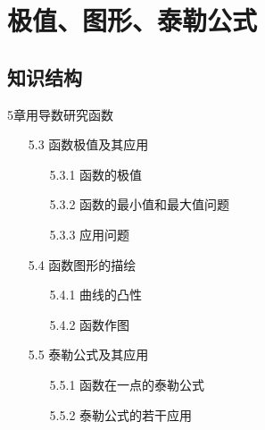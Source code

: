 \documentclass[12pt,UTF8]{ctexart}
\begin{document}
\setcounter{section}{7}
\section{极值、图形、泰勒公式}
\noindent
\subsection{知识结构}
5章用导数研究函数
	\begin{enumerate}
		\item[5.3] 函数极值及其应用
			\begin{enumerate}
				\item[5.3.1] 函数的极值
				\item[5.3.2] 函数的最小值和最大值问题
				\item[5.3.3] 应用问题
			\end{enumerate}
		\item[5.4] 函数图形的描绘
			\begin{enumerate}
				\item[5.4.1] 曲线的凸性
				\item[5.4.2] 函数作图
			\end{enumerate}
		\item[5.5] 泰勒公式及其应用
			\begin{enumerate}
				\item[5.5.1] 函数在一点的泰勒公式
				\item[5.5.2] 泰勒公式的若干应用
			\end{enumerate}
	\end{enumerate}
\end{document}
